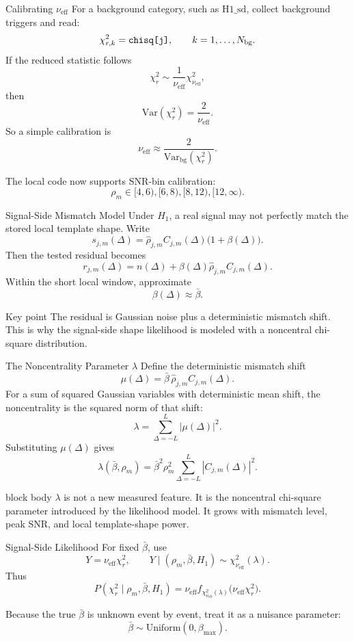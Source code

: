 \documentclass[aspectratio=169,10pt]{beamer}
\newcommand{\code}[1]{\ifmmode\text{\ttfamily\detokenize{#1}}\else\texttt{\detokenize{#1}}\fi}
\newcommand{\important}[1]{\begin{block}{Key point}\small #1\end{block}}
\newcommand{\proposal}[1]{\begin{beamercolorbox}[rounded=true,wd=\textwidth,sep=0.8em]{block body}\small #1\end{beamercolorbox}}
\begin{document}
\begin{frame}{Calibrating \(\nu_{\mathrm{eff}}\)}
\small
For a background category, such as \(\mathrm{H1\_sd}\), collect background triggers and read:
\[
\chi_{r,k}^2=\code{chisq[j]},\qquad k=1,\ldots,N_{\mathrm{bg}}.
\]
If the reduced statistic follows
\[
\chi_r^2\sim \frac{1}{\nu_{\mathrm{eff}}}\chi^2_{\nu_{\mathrm{eff}}},
\]
then
\[
\mathrm{Var}(\chi_r^2)=\frac{2}{\nu_{\mathrm{eff}}}.
\]
So a simple calibration is
\[
\nu_{\mathrm{eff}}\approx
\frac{2}{\mathrm{Var}_{\mathrm{bg}}(\chi_r^2)}.
\]

The local code now supports SNR-bin calibration:
\[
\rho_m\in[4,6),[6,8),[8,12),[12,\infty).
\]
\end{frame}

\begin{frame}{Signal-Side Mismatch Model}
\small
Under \(H_1\), a real signal may not perfectly match the stored local template shape.  Write
\[
s_{j,m}(\Delta)=
\hat\rho_{j,m}C_{j,m}(\Delta)\bigl(1+\beta(\Delta)\bigr).
\]
Then the tested residual becomes
\[
r_{j,m}(\Delta)
=
n(\Delta)+\beta(\Delta)\hat\rho_{j,m}C_{j,m}(\Delta).
\]
Within the short local window, approximate
\[
\beta(\Delta)\approx\bar\beta.
\]

\important{
The residual is Gaussian noise plus a deterministic mismatch shift.  This is why the signal-side shape likelihood is modeled with a noncentral chi-square distribution.
}
\end{frame}

\begin{frame}{The Noncentrality Parameter \(\lambda\)}
\small
Define the deterministic mismatch shift
\[
\mu(\Delta)=\bar\beta\,\hat\rho_{j,m}C_{j,m}(\Delta).
\]
For a sum of squared Gaussian variables with deterministic mean shift, the noncentrality is the squared norm of that shift:
\[
\lambda=\sum_{\Delta=-L}^{L}|\mu(\Delta)|^2.
\]
Substituting \(\mu(\Delta)\) gives
\[
\lambda(\bar\beta,\rho_m)
=
\bar\beta^2\rho_m^2
\sum_{\Delta=-L}^{L}|C_{j,m}(\Delta)|^2.
\]

\proposal{
\(\lambda\) is not a new measured feature.  It is the noncentral chi-square parameter introduced by the likelihood model.  It grows with mismatch level, peak SNR, and local template-shape power.
}
\end{frame}

\begin{frame}{Signal-Side Likelihood}
\small
For fixed \(\bar\beta\), use
\[
Y=\nu_{\mathrm{eff}}\chi_r^2,
\qquad
Y\mid(\rho_m,\bar\beta,H_1)
\sim
\chi^2_{\nu_{\mathrm{eff}}}(\lambda).
\]
Thus
\[
P(\chi_r^2\mid\rho_m,\bar\beta,H_1)
=
\nu_{\mathrm{eff}}
f_{\chi^2_{\nu_{\mathrm{eff}}}(\lambda)}
\bigl(\nu_{\mathrm{eff}}\chi_r^2\bigr).
\]

Because the true \(\bar\beta\) is unknown event by event, treat it as a nuisance parameter:
\[
\bar\beta\sim\mathrm{Uniform}(0,\beta_{\max}).
\]
\end{frame}
\end{document}
